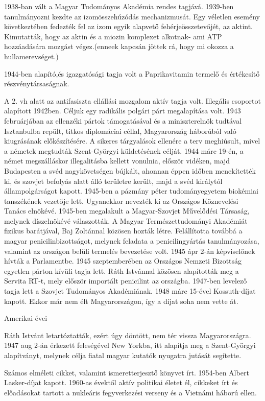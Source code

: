 \documentclass[10pt, conference,a4paper]{ITKproc}
\begin{document}
1938-ban vált a Magyar Tudományos Akadémia rendes tagjává.
1939-ben tanulmányozni kezdte az izomösszehúzódás mechanizmusát.
Egy véletlen esemény következtében fedezték fel az izom egyik alapvető fehérjeösszetevőjét, az aktint. Kimutatták, hogy az aktin és a miozin komplexet alkotnak- ami ATP hozzáadására mozgást végez.(enneek kapcsán jöttek rá, hogy mi okozza a hullamerevséget.)

1944-ben alapító,és igazgatósági tagja volt a Paprikavitamin termelő és értékesítő részvénytársaságnak.

A 2. vh alatt az antifasiszta ellállási mozgalom aktív tagja volt. Illegális csoportot alapított 1942ben. Céljuk egy radikális polgári párt megalapítása volt. 1943 februárjában az ellenzéki pártok támogatásával és a miniszterelnök tudtával Isztanbulba repült, titkos diplomáciai céllal, Magyarország háborúból való kiugrásának előkészítésére. A sikeres tárgyalások ellenére a terv meghiúsult, mivel a németek megtudták Szent-Györgyi küldetésének célját. 1944 márc 19-én, a német megszálláskor illegalitásba kellett vonulnia, először vidéken, majd Budapesten a svéd nagykövetségen bújkált, ahonnan éppen időben menekítették ki, és szovjet befolyás alatt álló területre került, majd a svéd királytól állampolgárságot kapott. 1945-ben a pázmány péter tudományegyetem biokémiai tanszékének vezetője lett. Ugyanekkor nevezték ki az Országos Köznevelési Tanács elnökévé. 1945-ben megalakult a Magyar-Szovjet Művelődési Társaság, melynek díszelnökévé válaszották. A Magyar Természettudományi Akadémiát fizikus barátjával, Baj Zoltánnal közösen hozták létre. Felállította továbbá a magyar penicilinbizottságot, melynek feladata a penicilingyártás tanulmányozása, valamint az országon belüli termelés bevezetése volt.  
1945 ápr 2-án képviselőnek hívták a Parlamentbe. 1945 szeptemberében az Országos Nemzeti Bizottság egyetlen párton kívüli tagja lett. Ráth Istvánnal közösen alapították meg a Servita RT-t, mely először importált penicilint az országba. 1947-ben levelező tagja lett a Szovjet Tudományos Akadémiának. 1948 márc 15-ével Kossuth-díjat kapott. Ekkor már nem élt Magyarországon, így a díjat soha nem vette át. 

Amerikai évei

Ráth Istvánt letartóztatták, ezért úgy döntött, nem tér vissza Magyarországra. 1947 aug 2-án érkezett feleségével New Yorkba, itt alapítja meg a Szent-Györgyi alapítványt, melynek célja fiatal magyar kutatók nyugatra jutását segítette. 

Számos elméleti cikket, valamint ismeretterjesztő könyvet írt. 1954-ben Albert Lasker-díjat kapott. 
1960-as évektől aktív politikai életet él, cikkeket írt és előadásokat tartott a nukleáris fegyverkezési verseny és a Vietnámi háború ellen. 
\end{document}
